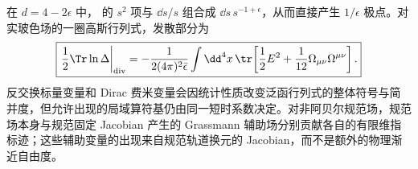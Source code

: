 在 \(d=4-2\epsilon\) 中， 的 \(s^2\) 项与 \(\dd s/s\) 组合成 \(\dd s\,s^{-1+\epsilon}\)，从而直接产生 \(1/\epsilon\) 极点。对实玻色场的一圈高斯行列式，发散部分为
\begin{equation}
 \boxed{
 \left.\frac12\Tr\ln\Delta\right|_{\rm div}
 =-\frac1{2(4\pi)^2\bar\epsilon}
 \int\dd^4 x\,
 \tr\!\left[
 \frac12E^2+\frac1{12}\Omega_{\mu\nu}\Omega^{\mu\nu}
 \right].}
 \label{eq:heat-kernel-divergence-master-dp11}
\end{equation}
反交换标量变量和 Dirac 费米变量会因统计性质改变泛函行列式的整体符号与简并度，但允许出现的局域算符基仍由同一短时系数决定。对非阿贝尔规范场，规范场本身与规范固定 Jacobian 产生的 Grassmann 辅助场分别贡献各自的有限维指标迹；这些辅助变量的出现来自规范轨道换元的 Jacobian，而不是额外的物理渐近自由度。
